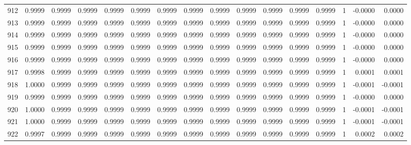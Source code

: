 \begin{tabular}{lrrrrrrrrrrrrrrr}
912 &      0.9999 &  0.9999 &  0.9999 &  0.9999 &  0.9999 &  0.9999 &  0.9999 &  0.9999 &  0.9999 &  0.9999 &   0.9999 &     0.9999 &      1 &                   -0.0000 &                     0.0000 \\
913 &      0.9999 &  0.9999 &  0.9999 &  0.9999 &  0.9999 &  0.9999 &  0.9999 &  0.9999 &  0.9999 &  0.9999 &   0.9999 &     0.9999 &      1 &                   -0.0000 &                     0.0000 \\
914 &      0.9999 &  0.9999 &  0.9999 &  0.9999 &  0.9999 &  0.9999 &  0.9999 &  0.9999 &  0.9999 &  0.9999 &   0.9999 &     0.9999 &      1 &                   -0.0000 &                     0.0000 \\
915 &      0.9999 &  0.9999 &  0.9999 &  0.9999 &  0.9999 &  0.9999 &  0.9999 &  0.9999 &  0.9999 &  0.9999 &   0.9999 &     0.9999 &      1 &                   -0.0000 &                     0.0000 \\
916 &      0.9999 &  0.9999 &  0.9999 &  0.9999 &  0.9999 &  0.9999 &  0.9999 &  0.9999 &  0.9999 &  0.9999 &   0.9999 &     0.9999 &      1 &                   -0.0000 &                     0.0000 \\
917 &      0.9998 &  0.9999 &  0.9999 &  0.9999 &  0.9999 &  0.9999 &  0.9999 &  0.9999 &  0.9999 &  0.9999 &   0.9999 &     0.9999 &      1 &                    0.0001 &                     0.0001 \\
918 &      1.0000 &  0.9999 &  0.9999 &  0.9999 &  0.9999 &  0.9999 &  0.9999 &  0.9999 &  0.9999 &  0.9999 &   0.9999 &     0.9999 &      1 &                   -0.0001 &                    -0.0001 \\
919 &      0.9999 &  0.9999 &  0.9999 &  0.9999 &  0.9999 &  0.9999 &  0.9999 &  0.9999 &  0.9999 &  0.9999 &   0.9999 &     0.9999 &      1 &                   -0.0000 &                     0.0000 \\
920 &      1.0000 &  0.9999 &  0.9999 &  0.9999 &  0.9999 &  0.9999 &  0.9999 &  0.9999 &  0.9999 &  0.9999 &   0.9999 &     0.9999 &      1 &                   -0.0001 &                    -0.0001 \\
921 &      1.0000 &  0.9999 &  0.9999 &  0.9999 &  0.9999 &  0.9999 &  0.9999 &  0.9999 &  0.9999 &  0.9999 &   0.9999 &     0.9999 &      1 &                   -0.0001 &                    -0.0001 \\
922 &      0.9997 &  0.9999 &  0.9999 &  0.9999 &  0.9999 &  0.9999 &  0.9999 &  0.9999 &  0.9999 &  0.9999 &   0.9999 &     0.9999 &      1 &                    0.0002 &                     0.0002 \\

\end{tabular}
